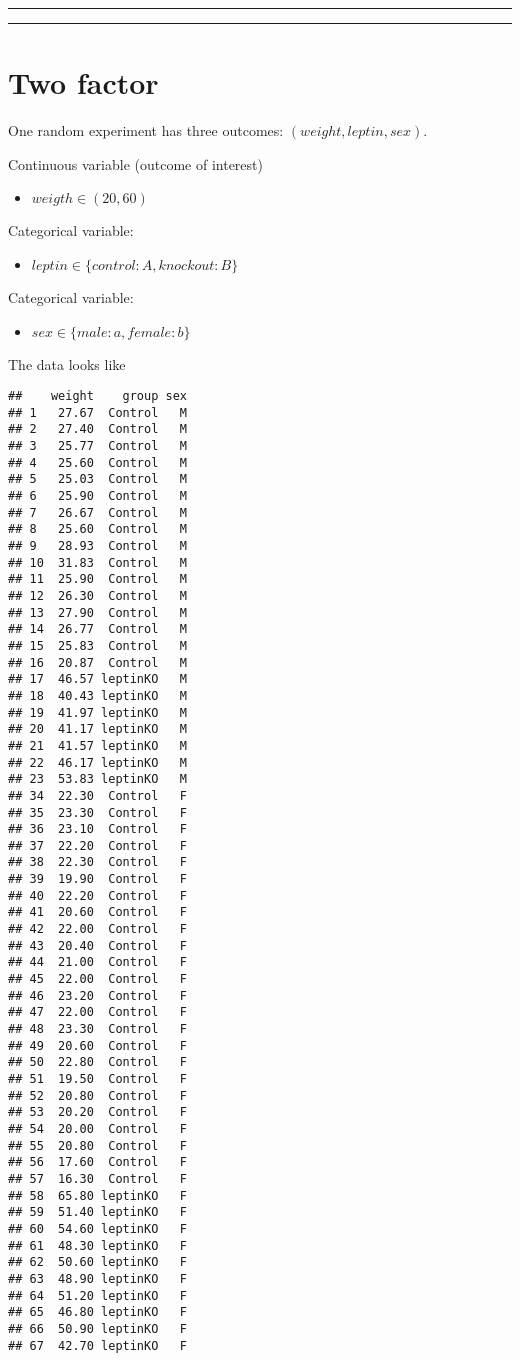 \documentclass[
]{book}
\providecommand{\tightlist}{%
  \setlength{\itemsep}{0pt}\setlength{\parskip}{0pt}}
\begin{document}
\begin{center}\rule{0.5\linewidth}{0.5pt}\end{center}

\begin{center}\rule{0.5\linewidth}{0.5pt}\end{center}

\hypertarget{two-factor}{%
\section{Two factor}\label{two-factor}}

One random experiment has three outcomes: \((weight, leptin, sex)\).

Continuous variable (outcome of interest)

\begin{itemize}
\tightlist
\item
  \(weigth \in (20, 60)\)
\end{itemize}

Categorical variable:

\begin{itemize}
\tightlist
\item
  \(leptin \in \{control:A,knockout:B\}\)
\end{itemize}

Categorical variable:

\begin{itemize}
\tightlist
\item
  \(sex \in \{male:a,female:b\}\)
\end{itemize}

The data looks like

\begin{verbatim}
##    weight    group sex
## 1   27.67  Control   M
## 2   27.40  Control   M
## 3   25.77  Control   M
## 4   25.60  Control   M
## 5   25.03  Control   M
## 6   25.90  Control   M
## 7   26.67  Control   M
## 8   25.60  Control   M
## 9   28.93  Control   M
## 10  31.83  Control   M
## 11  25.90  Control   M
## 12  26.30  Control   M
## 13  27.90  Control   M
## 14  26.77  Control   M
## 15  25.83  Control   M
## 16  20.87  Control   M
## 17  46.57 leptinKO   M
## 18  40.43 leptinKO   M
## 19  41.97 leptinKO   M
## 20  41.17 leptinKO   M
## 21  41.57 leptinKO   M
## 22  46.17 leptinKO   M
## 23  53.83 leptinKO   M
## 34  22.30  Control   F
## 35  23.30  Control   F
## 36  23.10  Control   F
## 37  22.20  Control   F
## 38  22.30  Control   F
## 39  19.90  Control   F
## 40  22.20  Control   F
## 41  20.60  Control   F
## 42  22.00  Control   F
## 43  20.40  Control   F
## 44  21.00  Control   F
## 45  22.00  Control   F
## 46  23.20  Control   F
## 47  22.00  Control   F
## 48  23.30  Control   F
## 49  20.60  Control   F
## 50  22.80  Control   F
## 51  19.50  Control   F
## 52  20.80  Control   F
## 53  20.20  Control   F
## 54  20.00  Control   F
## 55  20.80  Control   F
## 56  17.60  Control   F
## 57  16.30  Control   F
## 58  65.80 leptinKO   F
## 59  51.40 leptinKO   F
## 60  54.60 leptinKO   F
## 61  48.30 leptinKO   F
## 62  50.60 leptinKO   F
## 63  48.90 leptinKO   F
## 64  51.20 leptinKO   F
## 65  46.80 leptinKO   F
## 66  50.90 leptinKO   F
## 67  42.70 leptinKO   F
\end{verbatim}
\end{document}

